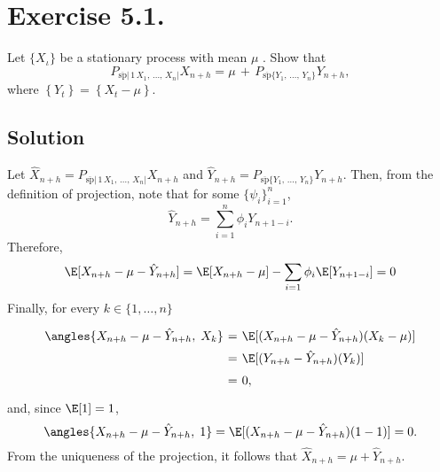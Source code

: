 \section*{Exercise 5.1.}

Let $\{X_{\iota} \}$ be a stationary process with mean $\mu$ . Show that
\[ P_{\overline{{{\mathrm{s p}}}} | \, 1 \, X_{1}, \, \ldots, \, X_{n} |} X_{n+h}=\mu\,+\, P_{\overline{{{\mathrm{s p}}}} \{ Y_{1}, \, \ldots, \, Y_{n} \}} Y_{n+h}, \]
where $\left\{Y_{t} \right\}=\left\{X_{t}-\mu\right\}$.


\subsection*{Solution}
Let $\hat{X}_{n+h} = P_{\overline{{{\mathrm{s p}}}} | \, 1 \, X_{1}, \, \ldots, \, X_{n} |} X_{n+h}$ and $\hat{Y}_{n+h} = P_{\overline{{{\mathrm{s p}}}} \{ Y_{1}, \, \ldots, \, Y_{n} \}} Y_{n+h}$. Then, from the definition of projection, note that for some $\{\psi_i\}_{i = 1}^{n}$,
\[ \hat{Y}_{n+h} = \sum_{i = 1}^n \phi_i Y_{n+1-i}. \]
Therefore,
\[ \E[X_{n+h} - \mu - \hat{Y}_{n+h}] = \E[X_{n+h} - \mu] - \sum_{i = 1} \phi_i \E[Y_{n+1-i}] = 0 \]
Finally, for every $k \in \{1,\ldots, n\}$
\[ \everymath{\displaystyle}
\arraycolsep=1.8pt\def\arraystretch{1.5}
\begin{array}{rcl}
    \angles{X_{n+h} - \mu - \hat{Y}_{n+h},\; X_k} & = & \E[(X_{n+h} - \mu - \hat{Y}_{n+h})(X_k - \mu)]\\
    & = & \E[(Y_{n+h} - \hat{Y}_{n+h})(Y_k)]\\
    & = & 0,
\end{array} \]
and, since $\E[1] = 1$,
\[ \angles{X_{n+h} - \mu - \hat{Y}_{n+h},\; 1} = \E[(X_{n+h} - \mu - \hat{Y}_{n+h})(1 - 1)] = 0.\]
From the uniqueness of the projection, it follows that $\hat{X}_{n+h} = \mu + \hat{Y}_{n+h}$.

